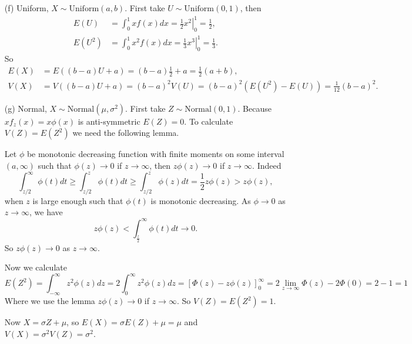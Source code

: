 \begin{itemize}
\item[(f)] Uniform, $X \sim \mathrm{Uniform}(a, b)$. First take $U \sim \mathrm{Uniform}(0, 1)$, then
\begin{equation*}
\begin{split}
E(U) &= \int_0^1 xf(x)dx = \left.\frac{1}{2}x^2\right|_0^1 = \frac{1}{2}, \\
E(U^2) &= \int_0^1 x^2f(x)dx = \left.\frac{1}{3}x^3\right|_0^1 = \frac{1}{3}.
\end{split}
\end{equation*}
So
\begin{equation*}
\begin{split}
E(X) &= E((b - a)U + a) = (b - a) \frac{1}{2} + a = \frac{1}{2}(a + b), \\
V(X) &= V((b - a)U + a) = (b - a)^2 V(U) = (b - a)^2 (E(U^2) - E(U)) = \frac{1}{12} (b - a)^2.
\end{split}
\end{equation*}

\item[(g)] Normal, $X \sim \mathrm{Normal}(\mu, \sigma^2)$.
First take $Z \sim \mathrm{Normal}(0, 1)$.
Because $xf_z(x) = x\phi(x)$ is anti-symmetric $E(Z) = 0$.
To calculate $V(Z) = E(Z^2)$ we need the following lemma.

Let $\phi$ be monotonic decreasing function with finite moments on some interval $(a, \infty)$ such that $\phi(z) \to 0$ if $z \to \infty$, then $z\phi(z) \to 0$ if $z \to \infty$.
Indeed
\begin{equation*}
\int_{z/2}^{\infty} \phi(t)dt
    \geq \int_{z/2}^{z} \phi(t)dt
    \geq \int_{z/2}^{z} \phi(z)dt
    = \frac{1}{2} z\phi(z)
    > z\phi(z),
\end{equation*}
when $z$ is large enough such that $\phi(t)$ is monotonic decreasing.
As $\phi \to 0$ as $z \to \infty$, we have
\begin{equation*}
z\phi(z) < \int_{\frac{z}{2}}^{\infty} \phi(t)dt \to 0.
\end{equation*}
So $z\phi(z) \to 0$ as $z \to \infty$.

Now we calculate
\begin{equation*}
E(Z^2) = \int_{-\infty}^{\infty} z^2\phi(z) dz
    = 2\int_{0}^{\infty} z^2\phi(z) dz
    = \left[\Phi(z) - z\phi(z)\right]_{0}^{\infty}
    = 2\lim_{z \to \infty} \Phi(z) - 2\Phi(0)
    = 2 - 1
    = 1
\end{equation*}
Where we use the lemma $z\phi(z) \to 0$ if $z \to \infty$.
So $V(Z) = E(Z^2) = 1$.

Now $X = \sigma Z + \mu$, so $E(X) = \sigma E(Z) + \mu = \mu$ and $V(X) = \sigma^2 V(Z) = \sigma^2$.


\end{itemize}
